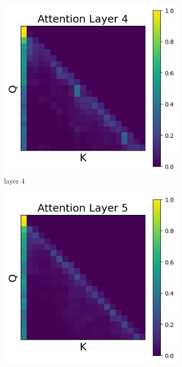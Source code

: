 \documentclass[11pt]{article}
\begin{document}
\begin{figure}[t]
  \begin{subfigure}[t]{0.24\textwidth}
    \centering
    \includegraphics[width=1.4\columnwidth]{figures/no_intervention/layer_4.png}
    \caption{layer 4}
  \end{subfigure}\hfill
  \begin{subfigure}[t]{0.24\textwidth}
    \centering
    \includegraphics[width=1.4\columnwidth]{figures/no_intervention/layer_5.png}

\end{subfigure}
\end{figure}
\end{document}
